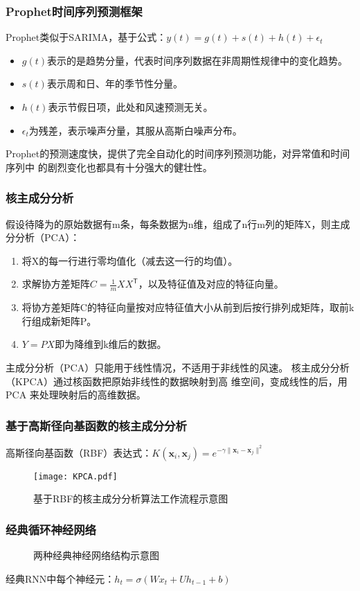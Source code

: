 \documentclass[14pt, AutoFakeBold]{ppt}
\begin{document}
\begin{frame}
  \frametitle{Prophet时间序列预测框架}
  Prophet类似于SARIMA，基于公式：$y(t)=g(t)+s(t)+h(t)+\epsilon_t$

  \begin{itemize}
    \item $g(t)$表示的是趋势分量，代表时间序列数据在非周期性规律中的变化趋势。
    \item $s(t)$表示周和日、年的季节性分量。
    \item $h(t)$表示节假日项，此处和风速预测无关。
    \item $\epsilon_{t}$为残差，表示噪声分量，其服从高斯白噪声分布。
  \end{itemize}
  \rightline{}
  Prophet的预测速度快，提供了完全自动化的时间序列预测功能，对异常值和时间序列中
的剧烈变化也都具有十分强大的健壮性。
\end{frame}

\begin{frame}
  \frametitle{核主成分分析}
  假设待降为的原始数据有m条，每条数据为n维，组成了n行m列的矩阵X，则主成分分析（PCA）：
  \begin{enumerate}
    \item 将X的每一行进行零均值化（减去这一行的均值）。
    \item 求解协方差矩阵$C=\frac{1}{m}XX^\mathsf{T}$，以及特征值及对应的特征向量。
    \item 将协方差矩阵C的特征向量按对应特征值大小从前到后按行排列成矩阵，取前k行组成新矩阵P。
    \item $Y=PX$即为降维到k维后的数据。
  \end{enumerate}

  主成分分析（PCA）只能用于线性情况，不适用于非线性的风速。
  \rightline{}
  核主成分分析（KPCA）通过核函数把原始非线性的数据映射到高
  维空间，变成线性的后，用 PCA 来处理映射后的高维数据。
\end{frame}

\begin{frame}
  \frametitle{基于高斯径向基函数的核主成分分析}
  高斯径向基函数（RBF）表达式：$K(\mathbf x_i,\mathbf x_j)=e^{-\gamma\|\mathbf x_i-\mathbf x_j\|^2}$
  \begin{figure}[H]
    \centering
    \texttt{[image: KPCA.pdf]}
    \caption{基于RBF的核主成分分析算法工作流程示意图}
    \label{fig_kpca}
  \end{figure}
\end{frame}

\begin{frame}
  \frametitle{经典循环神经网络}
  \begin{figure}[H]
    \centering
    \caption{两种经典神经网络结构示意图}
    \label{fig_nn}
  \end{figure}
  经典RNN中每个神经元：$h_t=\sigma(Wx_t+Uh_{t-1}+b)$
\end{frame}
\end{document}
